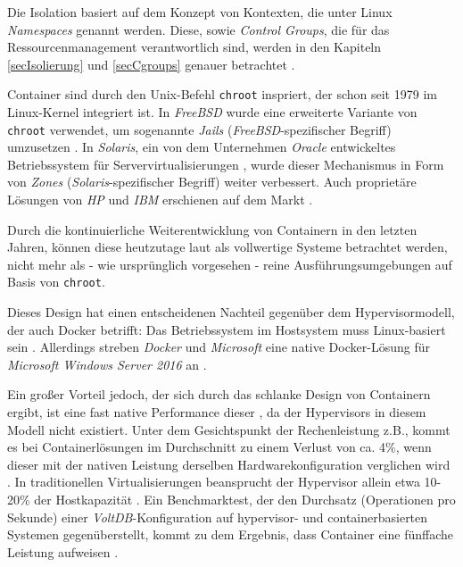 \documentclass[../main.tex]{subfiles}
\begin{document}
			Die Isolation basiert auf dem Konzept von Kontexten, die unter Linux \emph{Namespaces} genannt werden. Diese, sowie \emph{Control Groups}, die für das Ressourcenmanagement verantwortlich sind, werden in den Kapiteln \ref{secIsolierung} und \ref{secCgroups} genauer betrachtet \cite[S.4]{dockerSecIntro}.

      Container sind durch den Unix-Befehl \texttt{\acrshort{chroot}} inspriert, der schon seit 1979 im Linux-Kernel integriert ist. In \emph{FreeBSD} wurde eine erweiterte Variante von \texttt{chroot} verwendet, um sogenannte \emph{Jails} (\emph{FreeBSD}-spezifischer Begriff) umzusetzen \cite{jails}. In \emph{Solaris}, ein von dem Unternehmen \emph{Oracle} entwickeltes Betriebssystem für Servervirtualisierungen \cite{solaris}, wurde dieser Mechanismus in Form von \emph{Zones} (\emph{Solaris}-spezifischer Begriff) \cite{zones} weiter verbessert. Auch proprietäre Lösungen von \emph{HP} und \emph{IBM} erschienen auf dem Markt \cite[S.2]{dockerLXCKub}.

			Durch die kontinuierliche Weiterentwicklung von Containern in den letzten Jahren, können diese heutzutage laut \cite[S.7]{dockerBook} als vollwertige Systeme betrachtet werden, nicht mehr als - wie ursprünglich vorgesehen - reine Ausführungsumgebungen auf Basis von \texttt{chroot}.

			Dieses Design hat einen entscheidenen Nachteil gegenüber dem Hypervisormodell, der auch Docker betrifft: Das Betriebssystem im Hostsystem muss Linux-basiert sein \cite[S.6]{dockerBook}. Allerdings streben \emph{Docker} und \emph{Microsoft} eine native Docker-Lösung für \emph{Microsoft Windows Server 2016} an \cite{dockerWindowsSupport}.

			Ein großer Vorteil jedoch, der sich durch das schlanke Design von Containern ergibt, ist eine fast native Performance dieser \cite[S.1]{containerVirtPerformance}, da der Hypervisors in diesem Modell nicht existiert. Unter dem Gesichtspunkt der Rechenleistung z.B., kommt es bei Containerlösungen im Durchschnitt zu einem Verlust von ca. 4\%, wenn dieser mit der nativen Leistung derselben Hardwarekonfiguration verglichen wird \cite[S.4]{containerVirtPerformance}\cite[S.5]{IBMcontVMcomparison}. In traditionellen Virtualisierungen beansprucht der Hypervisor allein etwa 10-20\% der Hostkapazität \cite[S.2]{dockerIntroIEEE}\cite[S.5]{IBMcontVMcomparison}. Ein Benchmarktest, der den Durchsatz (Operationen pro Sekunde) einer \emph{VoltDB}-Konfiguration \cite{voltdb} auf hypervisor- und containerbasierten Systemen gegenüberstellt, kommt zu dem Ergebnis, dass Container eine fünffache Leistung aufweisen \cite[S.2f.]{voltdbBenchmark}.
\end{document}
